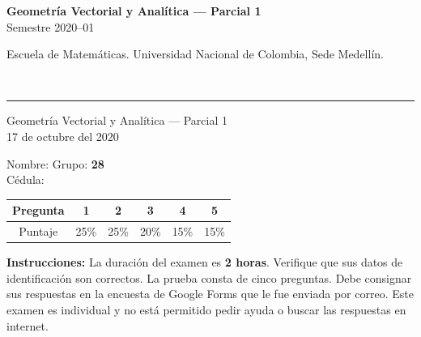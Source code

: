 \documentclass[11pt]{article}
\begin{document}
\noindent
\begin{minipage}[t]{0.6\linewidth}
{\small\bfseries Geometría Vectorial y Analítica --- Parcial 1}\\
{\small Semestre 2020--01}
\end{minipage}%
\hfill
\begin{minipage}[t]{0.35\linewidth}
\raggedleft\small Escuela de Matemáticas. Universidad Nacional de Colombia, Sede Medellín.
\end{minipage}\\[2pt]
\rule{\linewidth}{0.6pt}

\vspace{6pt}
\noindent Geometría Vectorial y Analítica --- Parcial 1\\
17 de octubre del 2020

\vspace{4pt}
\noindent Nombre: \underline{\hspace{6cm}}\hfill Grupo: \textbf{28}\\[4pt]
Cédula: \underline{\hspace{6cm}}

\vspace{10pt}
\begin{center}
\begin{tabular}{|c|c|c|c|c|c|}
\hline
Pregunta & 1 & 2 & 3 & 4 & 5 \\
\hline
Puntaje & 25\% & 25\% & 20\% & 15\% & 15\% \\
\hline
\end{tabular}
\end{center}

\vspace{10pt}
\textbf{Instrucciones:} La duración del examen es \textbf{2 horas}. Verifique que sus datos de identificación son correctos. La prueba consta de cinco preguntas. Debe consignar sus respuestas en la encuesta de Google Forms que le fue enviada por correo. Este examen es individual y no está permitido pedir ayuda o buscar las respuestas en internet.
\end{document}
